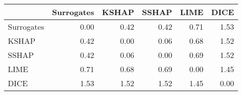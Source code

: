 \begin{tabular}{lrrrrr}
\toprule
{} &  Surrogates &  KSHAP &  SSHAP &  LIME &  DICE \\
\midrule
Surrogates &        0.00 &   0.42 &   0.42 &  0.71 &  1.53 \\
KSHAP      &        0.42 &   0.00 &   0.06 &  0.68 &  1.52 \\
SSHAP      &        0.42 &   0.06 &   0.00 &  0.69 &  1.52 \\
LIME       &        0.71 &   0.68 &   0.69 &  0.00 &  1.45 \\
DICE       &        1.53 &   1.52 &   1.52 &  1.45 &  0.00 \\
\bottomrule
\end{tabular}
